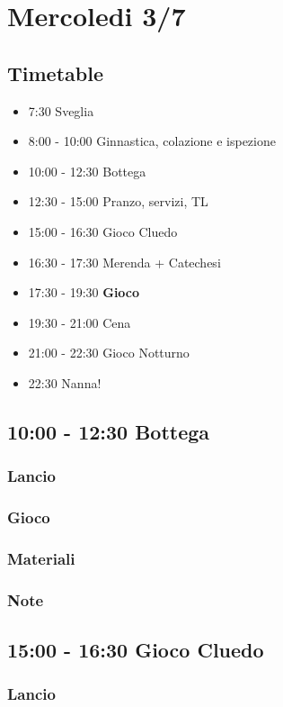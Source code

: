 \documentclass[../main.tex]{subfiles}
\begin{document}
   \section{Mercoledi 3/7}
   \subsection{Timetable}
   \begin{itemize}
        \item 7:30 Sveglia
        \item 8:00 - 10:00 Ginnastica, colazione e ispezione
        \item 10:00 - 12:30 Bottega
        \item 12:30 - 15:00 Pranzo, servizi, TL
        \item 15:00 - 16:30 Gioco Cluedo
        \item 16:30 - 17:30 Merenda + Catechesi
        \item 17:30 - 19:30 \textbf{Gioco}
        \item 19:30 - 21:00 Cena
        \item 21:00 - 22:30 Gioco Notturno
        \item 22:30 Nanna!
    \end{itemize}

   \subsection{10:00 - 12:30 Bottega}
       \subsubsection{Lancio}
        \subsubsection{Gioco}
        \subsubsection{Materiali}
        \subsubsection{Note}

    \subsection{15:00 - 16:30 Gioco Cluedo}
        \subsubsection{Lancio}
\end{document}
